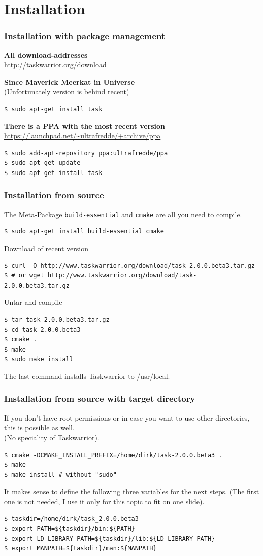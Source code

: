 \documentclass[t,handout]{beamer}
\begin{document}
\section{Installation}

\begin{frame}[fragile]
\frametitle{Installation with package management}
\textbf{All download-addresses} \\
\url{http://taskwarrior.org/download} \pause

\textbf{Since Maverick Meerkat in Universe} \\
(Unfortunately version is behind recent)
\begin{lstlisting}
$ sudo apt-get install task
\end{lstlisting} \pause

\textbf{There is a PPA with the most recent version} \\
\url{https://launchpad.net/~ultrafredde/+archive/ppa}
\begin{lstlisting}
$ sudo add-apt-repository ppa:ultrafredde/ppa
$ sudo apt-get update
$ sudo apt-get install task
\end{lstlisting}
\end{frame}

\begin{frame}[fragile]
\frametitle{Installation from source}
The Meta-Package \texttt{build-essential} and \texttt{cmake} are all you need to compile.
\begin{lstlisting}
$ sudo apt-get install build-essential cmake
\end{lstlisting}
Download of recent version
\begin{lstlisting}
$ curl -O http://www.taskwarrior.org/download/task-2.0.0.beta3.tar.gz
$ # or wget http://www.taskwarrior.org/download/task-2.0.0.beta3.tar.gz
\end{lstlisting}
Untar and compile
\begin{lstlisting}
$ tar task-2.0.0.beta3.tar.gz
$ cd task-2.0.0.beta3
$ cmake .
$ make
$ sudo make install
\end{lstlisting}
The last command installs Taskwarrior to /usr/local.
\end{frame}

\begin{frame}[fragile]
\frametitle{Installation from source with target directory}
If you don't have root permissions or in case you want to use other directories, this is possible as well. \\
(No speciality of Taskwarrior).
\begin{lstlisting}
$ cmake -DCMAKE_INSTALL_PREFIX=/home/dirk/task-2.0.0.beta3 .
$ make
$ make install # without "sudo"
\end{lstlisting}
It makes sense to define the following three variables for the next steps. (The first one is not needed, I use it only for this topic to fit on one slide).
\begin{lstlisting}
$ taskdir=/home/dirk/task_2.0.0.beta3
$ export PATH=${taskdir}/bin:${PATH}
$ export LD_LIBRARY_PATH=${taskdir}/lib:${LD_LIBRARY_PATH}
$ export MANPATH=${taskdir}/man:${MANPATH}
\end{lstlisting}
\end{frame}
\end{document}
